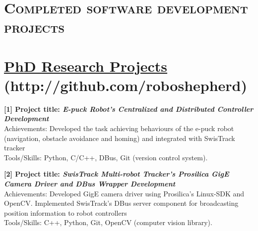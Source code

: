 \documentclass[notopicbreak,contbibnum,plain]{simplecv}
\begin{document}
\section{\textsc{Completed software development projects}}
\vspace*{-0.2cm}
\section{\textbf{\underline{PhD Research Projects} (http://github.com/roboshepherd)}}
\begin{topic}
\vspace*{-0.3cm}
\item \textbf{[1] Project title: \textit{E-puck Robot's Centralized and Distributed Controller Development}}\\
Achievements: Developed the task achieving behaviours of the e-puck robot (navigation, obstacle avoidance and homing) and integrated with SwisTrack tracker\\
Tools/Skills: Python, C/C++, DBus, Git (version control system).
\vspace*{-0.2cm}
\item \textbf{[2] Project title: \textit{SwisTrack Multi-robot Tracker's Prosilica GigE Camera Driver and DBus Wrapper Development}}\\
Achievements: Developed GigE camera driver using Prosilica's Linux-SDK and OpenCV. Implemented SwisTrack's DBus server component for broadcasting position information to robot controllers\\
Tools/Skills: C++, Python, Git, OpenCV (computer vision library).
\vspace*{-0.3cm}
\end{topic}
\end{document}
